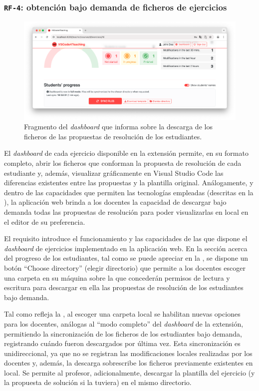 \subsubsection{\texttt{RF-4}: obtención bajo demanda de ficheros de ejercicios}
\label{subsec:rf4}

\begin{figure}[ht!]
    \centering
    \includegraphics[width=\textwidth]{imagenes/utilizadas/4-3-implementacion/rf4-1.png}
    \caption{Fragmento del \textit{dashboard} que informa sobre la descarga de los ficheros de las propuestas de resolución de los estudiantes.}
    \label{fig:reqf4-1}
\end{figure}

El \textit{dashboard} de cada ejercicio disponible en la extensión permite, en su formato completo, abrir los ficheros que conforman la propuesta de resolución de cada estudiante y, además, visualizar gráficamente en Visual Studio Code las diferencias existentes entre las propuestas y la plantilla original. Análogamente, y dentro de las capacidades que permiten las tecnologías empleadas (descritas en la ), la aplicación web brinda a los docentes la capacidad de descargar bajo demanda todas las propuestas de resolución para poder visualizarlas en local en el editor de su preferencia.

El requisito  introduce el funcionamiento y las capacidades de las que dispone el \textit{dashboard} de ejercicios implementado en la aplicación web. En la sección acerca del progreso de los estudiantes, tal como se puede apreciar en la , se dispone un botón ``Choose directory'' (elegir directorio) que permite a los docentes escoger una carpeta en su máquina sobre la que concederán permisos de lectura y escritura para descargar en ella las propuestas de resolución de los estudiantes bajo demanda.

Tal como refleja la , al escoger una carpeta local se habilitan nuevas opciones para los docentes, análogas al ``modo completo'' del \textit{dashboard} de la extensión, permitiendo la sincronización de los ficheros de los estudiantes bajo demanda, registrando cuándo fueron descargados por última vez. Esta sincronización es unidireccional, ya que no se registran las modificaciones locales realizadas por los docentes y, además, la descarga sobrescribe los ficheros previamente existentes en local. Se permite al profesor, adicionalmente, descargar la plantilla del ejercicio (y la propuesta de solución si la tuviera) en el mismo directorio.
